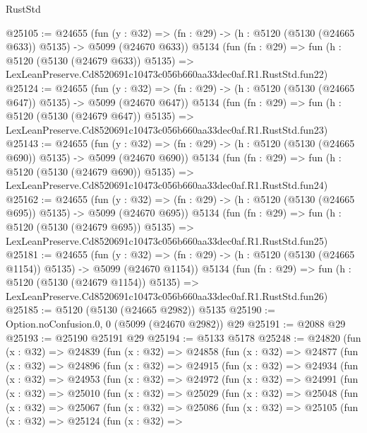 \begin{lexlean}{RustStd}
\begin{coremodule}
@25105 := @24655
    (fun (y : @32) => (fn : @29) -> (h : @5120 (@5130 (@24665 @633)) @5135) -> @5099 (@24670 @633))
    @5134
    (fun (fn : @29) =>
    fun (h : @5120 (@5130 (@24679 @633)) @5135) =>
    LexLeanPreserve.Cd8520691c10473c056b660aa33dec0af.R1.RustStd.fun22)
@25124 := @24655
    (fun (y : @32) => (fn : @29) -> (h : @5120 (@5130 (@24665 @647)) @5135) -> @5099 (@24670 @647))
    @5134
    (fun (fn : @29) =>
    fun (h : @5120 (@5130 (@24679 @647)) @5135) =>
    LexLeanPreserve.Cd8520691c10473c056b660aa33dec0af.R1.RustStd.fun23)
@25143 := @24655
    (fun (y : @32) => (fn : @29) -> (h : @5120 (@5130 (@24665 @690)) @5135) -> @5099 (@24670 @690))
    @5134
    (fun (fn : @29) =>
    fun (h : @5120 (@5130 (@24679 @690)) @5135) =>
    LexLeanPreserve.Cd8520691c10473c056b660aa33dec0af.R1.RustStd.fun24)
@25162 := @24655
    (fun (y : @32) => (fn : @29) -> (h : @5120 (@5130 (@24665 @695)) @5135) -> @5099 (@24670 @695))
    @5134
    (fun (fn : @29) =>
    fun (h : @5120 (@5130 (@24679 @695)) @5135) =>
    LexLeanPreserve.Cd8520691c10473c056b660aa33dec0af.R1.RustStd.fun25)
@25181 := @24655
    (fun (y : @32) =>
    (fn : @29) -> (h : @5120 (@5130 (@24665 @1154)) @5135) -> @5099 (@24670 @1154))
    @5134
    (fun (fn : @29) =>
    fun (h : @5120 (@5130 (@24679 @1154)) @5135) =>
    LexLeanPreserve.Cd8520691c10473c056b660aa33dec0af.R1.RustStd.fun26)
@25185 := @5120 (@5130 (@24665 @2982)) @5135
@25190 := Option.noConfusion.{0, 0} (@5099 (@24670 @2982)) @29
@25191 := @2088 @29
@25193 := @25190 @25191 @29
@25194 := @5133 @5178
@25248 := @24820
    (fun (x : @32) =>
    @24839
      (fun (x : @32) =>
      @24858
        (fun (x : @32) =>
        @24877
          (fun (x : @32) =>
          @24896
            (fun (x : @32) =>
            @24915
              (fun (x : @32) =>
              @24934
                (fun (x : @32) =>
                @24953
                  (fun (x : @32) =>
                  @24972
                    (fun (x : @32) =>
                    @24991
                      (fun (x : @32) =>
                      @25010
                        (fun (x : @32) =>
                        @25029
                          (fun (x : @32) =>
                          @25048
                            (fun (x : @32) =>
                            @25067
                              (fun (x : @32) =>
                              @25086
                                (fun (x : @32) =>
                                @25105
                                  (fun (x : @32) =>
                                  @25124
                                    (fun (x : @32) =>

\end{coremodule}
\end{lexlean}
